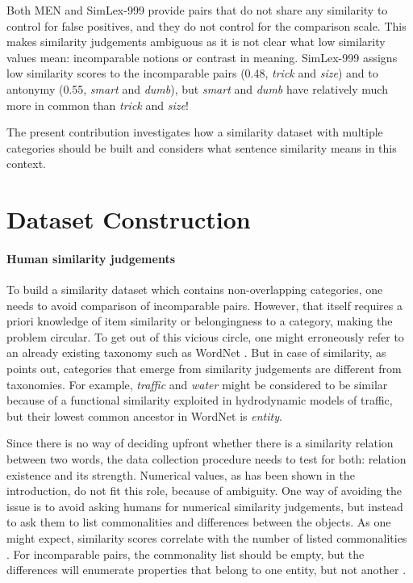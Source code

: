 \documentclass[11pt]{article}
\begin{document}
Both MEN and SimLex-999 provide pairs that do not share any similarity to control for false positives, and they do not control for the comparison scale. This makes similarity judgements ambiguous as it is not clear what low similarity values mean: incomparable notions or contrast in meaning. SimLex-999 assigns low similarity scores to the incomparable pairs (0.48, \textit{trick} and \textit{size}) and to antonymy (0.55, \textit{smart} and \textit{dumb}), but \textit{smart} and \textit{dumb} have relatively much more in common than \textit{trick} and \textit{size}!

The present contribution investigates how a similarity dataset with multiple categories should be built and considers what sentence similarity means in this context.

\section{Dataset Construction}

\paragraph{Human similarity judgements}

To build a similarity dataset which contains non-overlapping categories, one needs to avoid comparison of incomparable pairs. However, that itself requires a priori knowledge of item similarity or belongingness to a category, making the problem circular. To get out of this vicious circle, one might erroneously  refer to an already existing taxonomy such as WordNet \cite{Miller:1995:WLD:219717.219748}. But in case of similarity, as  points out, categories that emerge from similarity judgements are different from taxonomies. For example, \textit{traffic} and \textit{water} might be considered to be similar because of a functional similarity exploited in hydrodynamic models of traffic, but their lowest common ancestor in WordNet is \textit{entity}.

Since there is no way of deciding upfront whether there is a similarity relation between two words, the data collection procedure needs to test for both: relation existence and its strength. Numerical values, as has been shown in the introduction, do not fit this role, because of ambiguity. One way of avoiding the issue is to avoid asking humans for numerical similarity judgements, but instead to ask them to list commonalities and differences between the objects. As one might expect, similarity scores correlate with the number of listed commonalities \cite{markman1991commonalities,Markman1996,medin1993respects}. For incomparable pairs, the commonality list should be empty, but the differences will enumerate properties that belong to one entity, but not another \cite{markman1991commonalities,medin1993respects}.
\end{document}
